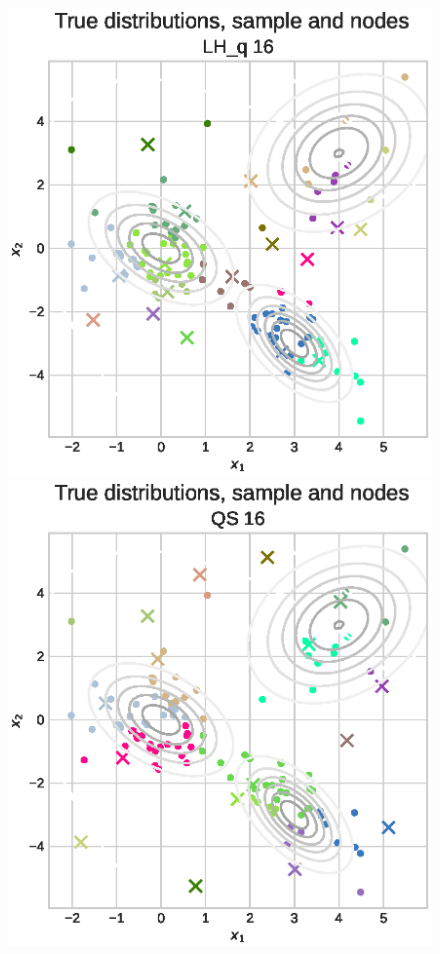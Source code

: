\documentclass[shortabstract]{iithesis}
\begin{document}
\begin{figure}[!ht]
    \includegraphics[scale=0.42]{gaussianHmm_discrete_example_latin_cube_q.eps}
    \includegraphics[scale=0.42]{gaussianHmm_discrete_example_sobol.eps}

\end{figure}
\end{document}
